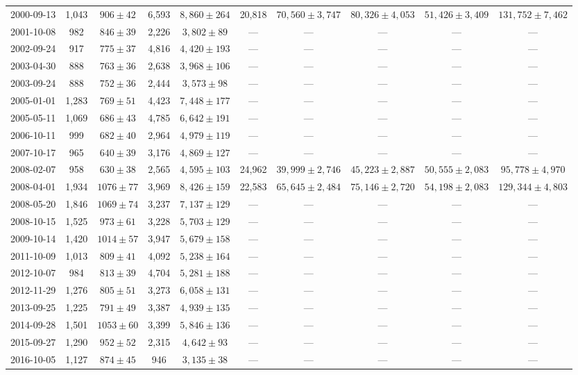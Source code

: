 \begin{landscape}
\begin{longtable}{cccccccccc}
{2000-09-13} & 1,043 & {$906  \pm  42$} & 6,593 & {$8,860 \pm 264$} & 20,818 & {$70,560 \pm 3,747$} & {$80,326 \pm 4,053$} & {$51,426 \pm 3,409$} & {$131,752 \pm 7,462$} \\
{2001-10-08} & 982 & {$846  \pm  39$} & 2,226 & {$3,802 \pm 89$} & --- & --- & --- & --- & --- \\
{2002-09-24} & 917 & {$775  \pm  37$} & 4,816 & {$4,420 \pm 193$} & --- & --- & --- & --- & --- \\
{2003-04-30} & 888 & {$763  \pm  36$} & 2,638 & {$3,968 \pm 106$} & --- & --- & --- & --- & --- \\
{2003-09-24} & 888 & {$752  \pm  36$} & 2,444 & {$3,573 \pm 98$} & --- & --- & --- & --- & --- \\
{2005-01-01} & 1,283 & {$769  \pm  51$} & 4,423 & {$7,448 \pm 177$} & --- & --- & --- & --- & --- \\
{2005-05-11} & 1,069 & {$686  \pm  43$} & 4,785 & {$6,642 \pm 191$} & --- & --- & --- & --- & --- \\
{2006-10-11} & 999 & {$682  \pm  40$} & 2,964 & {$4,979 \pm 119$} & --- & --- & --- & --- & --- \\
{2007-10-17} & 965 & {$640  \pm  39$} & 3,176 & {$4,869 \pm 127$} & --- & --- & --- & --- & --- \\
{2008-02-07} & 958 & {$630  \pm  38$} & 2,565 & {$4,595 \pm 103$} & 24,962 & {$39,999 \pm 2,746$} & {$45,223 \pm 2,887$} & {$50,555 \pm 2,083$} & {$95,778 \pm 4,970$} \\
{2008-04-01} & 1,934 & {$1076  \pm  77$} & 3,969 & {$8,426 \pm 159$} & 22,583 & {$65,645 \pm 2,484$} & {$75,146 \pm 2,720$} & {$54,198 \pm 2,083$} & {$129,344 \pm 4,803$} \\
{2008-05-20} & 1,846 & {$1069  \pm  74$} & 3,237 & {$7,137 \pm 129$} & --- & --- & --- & --- & --- \\
{2008-10-15} & 1,525 & {$973  \pm  61$} & 3,228 & {$5,703 \pm 129$} & --- & --- & --- & --- & --- \\
{2009-10-14} & 1,420 & {$1014  \pm  57$} & 3,947 & {$5,679 \pm 158$} & --- & --- & --- & --- & --- \\
{2011-10-09} & 1,013 & {$809  \pm  41$} & 4,092 & {$5,238 \pm 164$} & --- & --- & --- & --- & --- \\
{2012-10-07} & 984 & {$813  \pm  39$} & 4,704 & {$5,281 \pm 188$} & --- & --- & --- & --- & --- \\
{2012-11-29} & 1,276 & {$805  \pm  51$} & 3,273 & {$6,058 \pm 131$} & --- & --- & --- & --- & --- \\
{2013-09-25} & 1,225 & {$791  \pm  49$} & 3,387 & {$4,939 \pm 135$} & --- & --- & --- & --- & --- \\
{2014-09-28} & 1,501 & {$1053  \pm  60$} & 3,399 & {$5,846 \pm 136$} & --- & --- & --- & --- & --- \\
{2015-09-27} & 1,290 & {$952  \pm  52$} & 2,315 & {$4,642 \pm 93$} & --- & --- & --- & --- & --- \\
{2016-10-05} & 1,127 & {$874  \pm  45$} & 946 & {$3,135 \pm 38$} & --- & --- & --- & --- & --- \\
\end{longtable} 
\end{landscape} 
